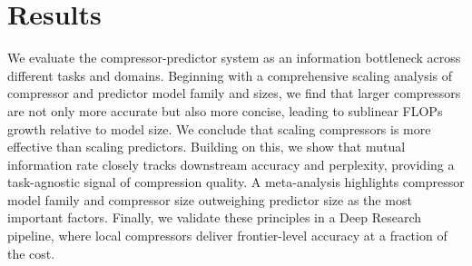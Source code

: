 \documentclass{article} %
\begin{document}

\section{Results}
\label{sec:results}

We evaluate the compressor-predictor system as an information bottleneck across different tasks and domains. 
Beginning with a comprehensive scaling analysis of compressor and predictor model family and sizes, we find that larger compressors are not only more accurate but also more concise, leading to sublinear FLOPs growth relative to model size. 
We conclude that scaling compressors is more effective than scaling predictors.
Building on this, we show that mutual information rate closely tracks downstream accuracy and perplexity, providing a task-agnostic signal of compression quality. 
A meta-analysis highlights compressor model family and compressor size outweighing predictor size as the most important factors. 
Finally, we validate these principles in a Deep Research pipeline, where local compressors deliver frontier-level accuracy at a fraction of the cost.
\end{document}
